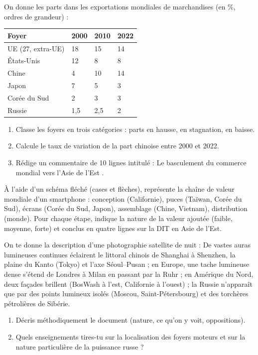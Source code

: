 \documentclass[11pt]{article}
\begin{document}
\begin{exercice}
On donne les parts dans les exportations mondiales de marchandises (en \%, ordres de grandeur) :
\begin{center}
\begin{tabularx}{\linewidth}{|l|X|X|X|}
\hline
\rowcolor{popblueL} \textbf{Foyer} & \textbf{2000} & \textbf{2010} & \textbf{2022} \\
\hline
UE (27, extra-UE) & 18 & 15 & 14 \\
\hline
États-Unis & 12 & 8 & 8 \\
\hline
Chine & 4 & 10 & 14 \\
\hline
Japon & 7 & 5 & 3 \\
\hline
Corée du Sud & 2 & 3 & 3 \\
\hline
Russie & 1,5 & 2,5 & 2 \\
\hline
\end{tabularx}
\end{center}
\begin{enumerate}
\item Classe les foyers en trois catégories : parts en hausse, en stagnation, en baisse.
\item Calcule le taux de variation de la part chinoise entre 2000 et 2022.
\item Rédige un commentaire de 10 lignes intitulé : \og Le basculement du commerce mondial vers l'Asie de l'Est \fg{}.
\end{enumerate}
\end{exercice}

\begin{exercice}
À l'aide d'un schéma fléché (cases et flèches), représente la chaîne de valeur mondiale d'un smartphone : conception (Californie), puces (Taïwan, Corée du Sud), écrans (Corée du Sud, Japon), assemblage (Chine, Vietnam), distribution (monde). Pour chaque étape, indique la nature de la valeur ajoutée (faible, moyenne, forte) et conclus en quatre lignes sur la DIT en Asie de l'Est.
\end{exercice}

\begin{exercice}
On te donne la description d'une photographie satellite de nuit : \og De vastes auras lumineuses continues éclairent le littoral chinois de Shanghai à Shenzhen, la plaine du Kanto (Tokyo) et l'axe Séoul--Pusan ; en Europe, une tache lumineuse dense s'étend de Londres à Milan en passant par la Ruhr ; en Amérique du Nord, deux façades brillent (BosWash à l'est, Californie à l'ouest) ; la Russie n'apparaît que par des points lumineux isolés (Moscou, Saint-Pétersbourg) et des torchères pétrolières de Sibérie. \fg{}
\begin{enumerate}
\item Décris méthodiquement le document (nature, ce qu'on y voit, oppositions).
\item Quels enseignements tires-tu sur la localisation des foyers moteurs et sur la nature particulière de la puissance russe ?
\end{enumerate}
\end{exercice}
\end{document}
